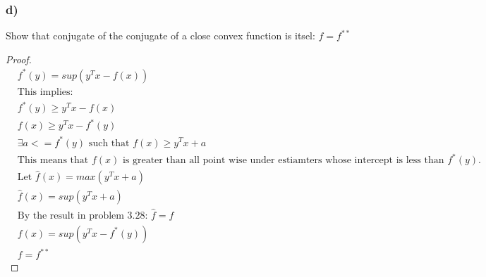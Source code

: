 \documentclass[12pt]{article}
\begin{document}
\subsubsection*{d)}
Show that conjugate of the conjugate of a close convex function is itsel: $f = f^{**}$
\begin{proof}{}
\begin{align*}
& f^*(y) = sup(y^Tx - f(x))\\
& \text{This implies: }\\
& f^*(y) \ge y^Tx - f(x)\\
& f(x) \ge y^Tx - f^*(y)\\
& \exists a < =f^*(y) \text{ such that } f(x) \ge y^Tx + a\\
& \text{This means that $f(x)$ is greater than all point wise under estiamters whose intercept is less than $f^*(y)$.}\\
& \text{Let } \hat f(x) = max(y^Tx + a)\\
& \hat f(x) = sup(y^Tx + a)\\
& \text{By the result in problem 3.28: } \hat f = f\\
& f(x) = sup(y^Tx - f^*(y))\\
& f = f^{**}
\end{align*}
\end{proof}

 
\end{document}
